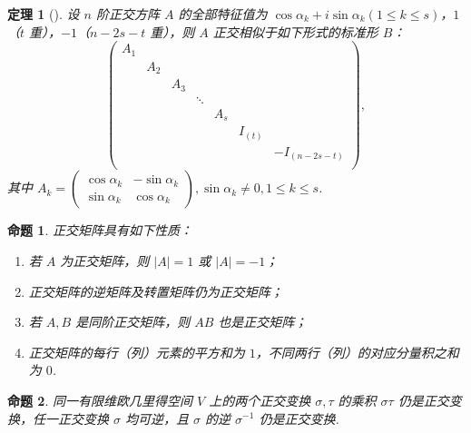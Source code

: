 \documentclass[zihao=-4,UTF8,linespread=1.8,nothm]{aytony_base}
\newtheorem{theorem}{\indent 定理}[subsection]
\newtheorem{proposition}{\indent 命题}[subsection]
\begin{document}
\begin{theorem}[]
    设 $n$ 阶正交方阵 $A$ 的全部特征值为 $\cos \alpha_k + i \sin \alpha_k(1 \leqslant k\leqslant s)$，$1$（$t$ 重），$-1$（$n - 2s - t$ 重），则 $A$ 正交相似于如下形式的标准形 $B$：$$
        \left(
        \begin{matrix}
                A_1                                                   \\
                 & A_2                                                \\
                 &     & A_3                                          \\
                 &     &     & \ddots                                 \\
                 &     &     &        & A_s                           \\
                 &     &     &        &     & I_{(t)}                 \\
                 &     &     &        &     &         & -I_{(n-2s-t)} \\
            \end{matrix}
        \right),
    $$ 其中 $A_k = \left(
        \begin{matrix}
                \cos \alpha_k & -\sin \alpha_k \\
                \sin \alpha_k & \cos \alpha_k
            \end{matrix}
        \right), \sin \alpha_k \neq 0, 1 \leqslant k \leqslant s$.
\end{theorem}

\begin{proposition}
    正交矩阵具有如下性质：
    \begin{enumerate}[nosep]
        \item 若 $A$ 为正交矩阵，则 $|A| = 1$ 或 $|A| = -1$；
        \item 正交矩阵的逆矩阵及转置矩阵仍为正交矩阵；
        \item 若 $A, B$ 是同阶正交矩阵，则 $AB$ 也是正交矩阵；
        \item 正交矩阵的每行（列）元素的平方和为 $1$，不同两行（列）的对应分量积之和为 $0$.
    \end{enumerate}
\end{proposition}

\begin{proposition}
    同一有限维欧几里得空间 $V$ 上的两个正交变换 $\sigma, \tau$ 的乘积 $\sigma\tau$ 仍是正交变换，任一正交变换 $\sigma$ 均可逆，且 $\sigma$ 的逆 $\sigma^{-1}$ 仍是正交变换.
\end{proposition}
\end{document}

